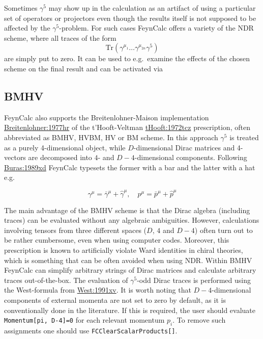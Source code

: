 \documentclass[../FeynCalcManual.tex]{subfiles}
\begin{document}
Sometimes \(\gamma^5\) may show up in the calculation as an artifact of
using a particular set of operators or projectors even though the
results itself is not supposed to be affected by the
\(\gamma^5\)-problem. For such cases FeynCalc offers a variety of the
NDR scheme, where all traces of the form \begin{equation}
\mathrm{Tr}(\gamma^{\mu_1} \ldots \gamma^{\mu_{2n}} \gamma^5)
\end{equation} are simply put to zero. It can be used to e.g.~examine
the effects of the chosen scheme on the final result and can be
activated via

\begin{Shaded}
\begin{Highlighting}[]
\OperatorTok{[}\OperatorTok{]}
\end{Highlighting}
\end{Shaded}

\hypertarget{bmhv}{%
\subsection{BMHV}\label{bmhv}}

FeynCalc also supports the Breitenlohner-Maison implementation
\href{https://doi.org/10.1007/BF01609069}{Breitenlohner:1977hr} of the
t'Hooft-Veltman
\href{https://doi.org/10.1016/0550-3213(72)90279-9}{tHooft:1972tcz}
prescription, often abbreviated as BMHV, HVBM, HV or BM scheme. In this
approach \(\gamma^5\) is treated as a purely 4-dimensional object, while
\(D\)-dimensional Dirac matrices and 4-vectors are decomposed into
\(4\)- and \(D-4\)-dimensional components. Following
\href{https://doi.org/10.1016/0550-3213(90)90223-Z}{Buras:1989xd}
FeynCalc typesets the former with a bar and the latter with a hat e.g.

\begin{equation}
\gamma^\mu = \bar{\gamma}^\mu + \hat{\gamma}^\mu, \quad p^\mu = \bar{p}^\mu + \hat{p}^\mu
\end{equation}

The main advantage of the BMHV scheme is that the Dirac algebra
(including traces) can be evaluated without any algebraic ambiguities.
However, calculations involving tensors from three different spaces
(\(D\), \(4\) and \(D-4\)) often turn out to be rather cumbersome, even
when using computer codes. Moreover, this prescription is known to
artificially violate Ward identities in chiral theories, which is
something that can be often avoided when using NDR. Within BMHV FeynCalc
can simplify arbitrary strings of Dirac matrices and calculate arbitrary
traces out-of-the-box. The evaluation of \(\gamma^5\)-odd Dirac traces
is performed using the West-formula from
\href{https://doi.org/10.1016/0010-4655(93)90011-Z}{West:1991xv}. It is
worth noting that \(D-4\)-dimensional components of external momenta are
not set to zero by default, as it is conventionally done in the
literature. If this is required, the user should evaluate
\texttt{Momentum[\allowbreak{}pi,\ \allowbreak{}D-4]=0} for each
relevant momentum \(p_i\). To remove such assignments one should use
\texttt{FCClearScalarProducts[\allowbreak{}]}.
\end{document}
